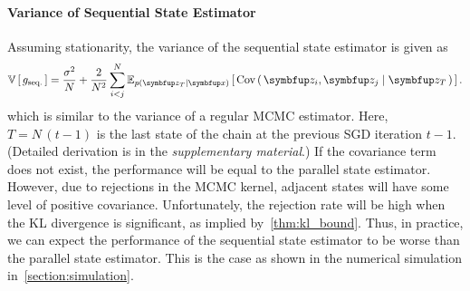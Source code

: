 \paragraph{Variance of Sequential State Estimator}
Assuming stationarity, the variance of the sequential state estimator is given as
\begin{align}
  \V{g_{\text{seq.}}} = \frac{\sigma^2}{N} + \frac{2}{N^2} \sum_{i < j}^N \Esub{p\left(\vz_T \mid \vx \right)}{ \Cov{ \vz_{i}, \vz_{j} \mid \vz_{T} } }\label{eq:var_seq}.
\end{align}
which is similar to the variance of a regular MCMC estimator.
Here, \(T = N\,\left(t - 1\right)\) is the last state of the chain at the previous SGD iteration \(t-1\).
(Detailed derivation is in the \textit{supplementary material}.)
If the covariance term does not exist, the performance will be equal to the parallel state estimator.
However, due to rejections in the MCMC kernel, adjacent states will have some level of positive covariance.
Unfortunately, the rejection rate will be high when the KL divergence is significant, as implied by~\cref{thm:kl_bound}.
Thus, in practice, we can expect the performance of the sequential state estimator to be worse than the parallel state estimator.
This is the case as shown in the numerical simulation in~\cref{section:simulation}.

%
%
%

%

